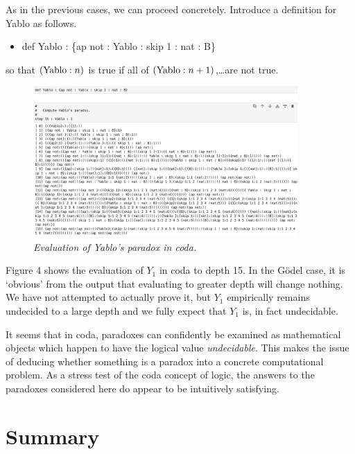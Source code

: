 \documentclass[11pt]{article}
\begin{document}
     As in the previous cases, we can proceed concretely.  Introduce a definition for Yablo as follows.
\begin{itemize}
\item def Yablo : \{ap not : Yablo : skip 1 : nat : B\}
\end{itemize}
so that $({\rm Yablo}:n)$ is true if all of $({\rm Yablo}:n+1)$,\dots are not true.
\begin{figure}[h]
\centering
\includegraphics[width=0.9\textwidth]{Yablo.png}
\caption{{\it Evaluation of Yablo's paradox in coda.}}
\end{figure}
Figure 4 shows the evaluation of $Y_1$ in coda to depth 15.  In the G\"odel case, it is `obvious' from
the output that evaluating to greater depth will change nothing.  We have not attempted to actually
prove it, but $Y_1$ empirically remains undecided to a large depth and we fully expect that
$Y_1$ is, in fact undecidable.

It seems that in coda, paradoxes can confidently be examined as mathematical objects which
happen to have the logical value {\it undecidable}.  This makes the issue of deducing whether something
is a paradox into a concrete computational problem.  As a stress test of the coda concept
of logic, the answers to the paradoxes considered here do appear to be intuitively satisfying.

\section{Summary}
\end{document}
